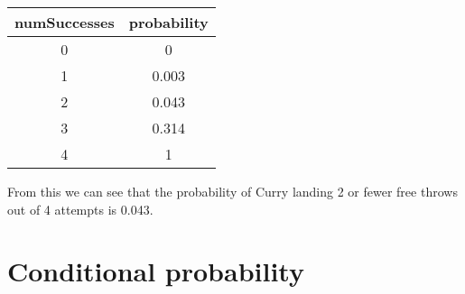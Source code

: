 \documentclass[]{book}
\theoremstyle{definition}
\theoremstyle{definition}
\theoremstyle{definition}
\theoremstyle{remark}
\begin{document}
\begin{longtable}[]{@{}cc@{}}
\toprule
\begin{minipage}[b]{0.20\columnwidth}\centering\strut
numSuccesses\strut
\end{minipage} & \begin{minipage}[b]{0.20\columnwidth}\centering\strut
probability\strut
\end{minipage}\tabularnewline
\midrule
\endhead
\begin{minipage}[t]{0.20\columnwidth}\centering\strut
0\strut
\end{minipage} & \begin{minipage}[t]{0.20\columnwidth}\centering\strut
0\strut
\end{minipage}\tabularnewline
\begin{minipage}[t]{0.20\columnwidth}\centering\strut
1\strut
\end{minipage} & \begin{minipage}[t]{0.20\columnwidth}\centering\strut
0.003\strut
\end{minipage}\tabularnewline
\begin{minipage}[t]{0.20\columnwidth}\centering\strut
2\strut
\end{minipage} & \begin{minipage}[t]{0.20\columnwidth}\centering\strut
0.043\strut
\end{minipage}\tabularnewline
\begin{minipage}[t]{0.20\columnwidth}\centering\strut
3\strut
\end{minipage} & \begin{minipage}[t]{0.20\columnwidth}\centering\strut
0.314\strut
\end{minipage}\tabularnewline
\begin{minipage}[t]{0.20\columnwidth}\centering\strut
4\strut
\end{minipage} & \begin{minipage}[t]{0.20\columnwidth}\centering\strut
1\strut
\end{minipage}\tabularnewline
\bottomrule
\end{longtable}

From this we can see that the probability of Curry landing 2 or fewer
free throws out of 4 attempts is 0.043.

\section{Conditional probability}\label{conditional-probability}
\end{document}
